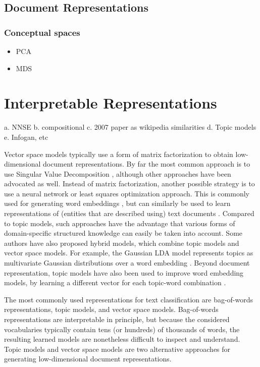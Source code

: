 \subsection{Document Representations}
\subsubsection{Conceptual spaces}
\begin{itemize}
	\item PCA %
	\item MDS
\end{itemize}
\section{Interpretable Representations}
a. NNSE
b. compositional
c. 2007 paper as wikipedia similarities
d. Topic models
e. Infogan, etc

Vector space models typically use a form of matrix factorization to obtain low-dimensional document representations. By far the most common approach is to use Singular Value Decomposition \cite{ASI:ASI1}, although other approaches have been advocated as well. 
Instead of matrix factorization, another possible strategy is to use a neural network or least squares optimization approach. This is commonly used for generating word embeddings \cite{DBLP:conf/nips/MikolovSCCD13,glove2014}, but can similarly be used to learn representations of (entities that are described using) text documents \cite{DBLP:journals/corr/DaiOL15,van2016learning,DBLP:conf/sigir/JameelBS17}. Compared to topic models, such approaches have the advantage that various forms of domain-specific structured knowledge can easily be taken into account. Some authors have also proposed hybrid models, which combine topic models and vector space models. For example, the Gaussian LDA model represents topics as multivariate Gaussian distributions over a word embedding \cite{DBLP:conf/acl/DasZD15}. Beyond document representation, topic models have also been used to improve word embedding models, by learning a different vector for each topic-word combination \cite{DBLP:conf/aaai/LiuLCS15}. %

The most commonly used representations for text classification are bag-of-words representations, topic models, and vector space models. Bag-of-words representations are interpretable in principle, but because the considered vocabularies typically contain tens (or hundreds) of thousands of words, the resulting learned models are nonetheless difficult to inspect and understand. Topic models and vector space models are two alternative approaches for generating low-dimensional document representations. %

